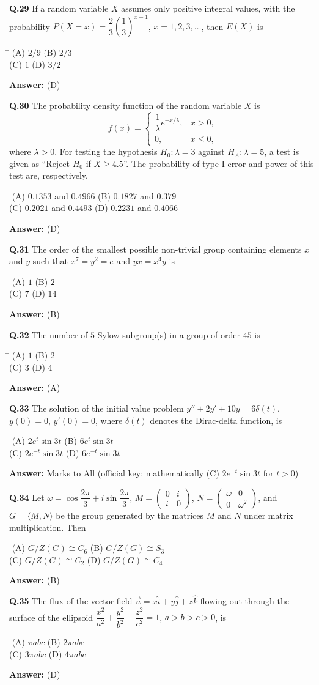\documentclass[11pt,a4paper]{article}
\newcommand{\optsfourA}[4]{%
  \begin{tabbing}
    \hspace{0.48\linewidth}\=\kill
    (A) #1 \> (B) #2 \\[2pt]
    (C) #3 \> (D) #4
  \end{tabbing}%
}
\newcommand{\ans}[1]{\textbf{Answer:} #1\par\medskip}
\begin{document}
\textbf{Q.29} If a random variable $X$ assumes only positive integral values, with the probability $P(X = x) = \dfrac{2}{3}\left(\dfrac{1}{3}\right)^{x-1}$, $x = 1, 2, 3, \dots$, then $E(X)$ is
\optsfourA{$2/9$}{$2/3$}{$1$}{$3/2$}
\ans{(D)}

\textbf{Q.30} The probability density function of the random variable $X$ is
\[
  f(x) = \begin{cases} \dfrac{1}{\lambda}e^{-x/\lambda}, & x > 0, \\ 0, & x \le 0, \end{cases}
\]
where $\lambda > 0$. For testing the hypothesis $H_0 : \lambda = 3$ against $H_A : \lambda = 5$, a test is given as ``Reject $H_0$ if $X \ge 4.5$''. The probability of type I error and power of this test are, respectively,
\optsfourA{$0.1353$ and $0.4966$}{$0.1827$ and $0.379$}{$0.2021$ and $0.4493$}{$0.2231$ and $0.4066$}
\ans{(D)}

\textbf{Q.31} The order of the smallest possible non-trivial group containing elements $x$ and $y$ such that $x^7 = y^2 = e$ and $yx = x^4 y$ is
\optsfourA{$1$}{$2$}{$7$}{$14$}
\ans{(B)}

\textbf{Q.32} The number of $5$-Sylow subgroup(s) in a group of order $45$ is
\optsfourA{$1$}{$2$}{$3$}{$4$}
\ans{(A)}

\textbf{Q.33} The solution of the initial value problem $y'' + 2y' + 10y = 6\delta(t)$, $y(0) = 0$, $y'(0) = 0$, where $\delta(t)$ denotes the Dirac-delta function, is
\optsfourA{$2e^t\sin 3t$}{$6e^t\sin 3t$}{$2e^{-t}\sin 3t$}{$6e^{-t}\sin 3t$}
\ans{Marks to All (official key; mathematically (C) $2e^{-t}\sin 3t$ for $t > 0$)}

\textbf{Q.34} Let $\omega = \cos\dfrac{2\pi}{3} + i\sin\dfrac{2\pi}{3}$, $M = \begin{pmatrix} 0 & i \\ i & 0 \end{pmatrix}$, $N = \begin{pmatrix} \omega & 0 \\ 0 & \omega^2 \end{pmatrix}$, and $G = \langle M, N \rangle$ be the group generated by the matrices $M$ and $N$ under matrix multiplication. Then
\optsfourA{$G / Z(G) \cong C_6$}{$G / Z(G) \cong S_3$}{$G / Z(G) \cong C_2$}{$G / Z(G) \cong C_4$}
\ans{(B)}

\textbf{Q.35} The flux of the vector field $\vec{u} = x\hat{i} + y\hat{j} + z\hat{k}$ flowing out through the surface of the ellipsoid $\dfrac{x^2}{a^2} + \dfrac{y^2}{b^2} + \dfrac{z^2}{c^2} = 1$, $a > b > c > 0$, is
\optsfourA{$\pi abc$}{$2\pi abc$}{$3\pi abc$}{$4\pi abc$}
\ans{(D)}
\end{document}
